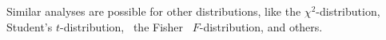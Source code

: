 \documentclass[titlepage,fleqn]{article}%
\begin{document}
%


\bigskip Similar analyses are possible for other distributions, like the
$\chi^{2}$-distribution, Student's $t$-distribution, \ the Fisher
\ $F$-distribution, and others.
\end{document}
